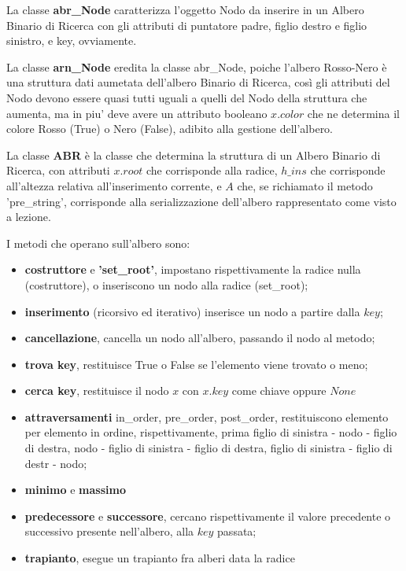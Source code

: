 \documentclass{article}
\begin{document}
La classe \textbf{abr\_Node} caratterizza l'oggetto Nodo da inserire in un Albero Binario di Ricerca con gli attributi di puntatore padre, figlio destro e figlio sinistro, e key, ovviamente.


La classe \textbf{arn\_Node} eredita la classe abr\_Node, poiche l'albero Rosso-Nero è una struttura dati aumetata dell'albero Binario di Ricerca, così gli attributi del Nodo devono essere quasi tutti uguali a quelli del Nodo della struttura che aumenta, ma in piu' deve avere un attributo booleano $x.color$ che ne determina il colore Rosso (True) o Nero (False), adibito alla gestione dell'albero.


La classe \textbf{ABR} è la classe che determina la struttura di un Albero Binario di Ricerca, con attributi $x.root$ che corrisponde alla radice, $h\_ins$ che corrisponde all'altezza relativa all'inserimento corrente, e $A$ che, se richiamato il metodo 'pre\_string', corrisponde alla serializzazione dell'albero rappresentato come visto a lezione. 


I metodi che operano sull'albero sono: 
\begin{itemize}
\item \textbf{costruttore} e \textbf{'set\_root'}, impostano rispettivamente la radice nulla (costruttore), o inseriscono un nodo alla radice (set\_root);
\item \textbf{inserimento} (ricorsivo ed iterativo) inserisce un nodo a partire dalla $key$;
\item \textbf{cancellazione}, cancella un nodo all'albero, passando il nodo al metodo;
\item \textbf{trova key}, restituisce True o False se l'elemento viene trovato o meno;
\item \textbf{cerca key}, restituisce il nodo $x$ con $x.key$ come chiave oppure $None$
\item \textbf{attraversamenti} in\_order, pre\_order, post\_order, restituiscono elemento per elemento in ordine, rispettivamente, prima figlio di sinistra - nodo - figlio di destra, nodo - figlio di sinistra - figlio di destra, figlio di sinistra - figlio di destr - nodo;
\item \textbf{minimo} e \textbf{massimo}
\item \textbf{predecessore} e \textbf{successore}, cercano rispettivamente il valore precedente o successivo presente nell'albero, alla $key$ passata;
\item \textbf{trapianto}, esegue un trapianto fra alberi data la radice
\end{itemize}
\end{document}

